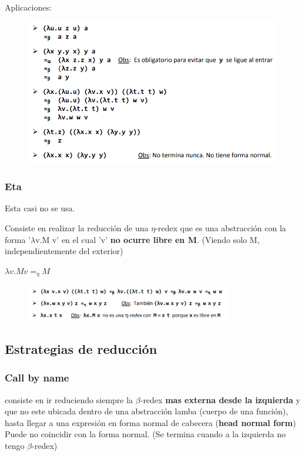 Aplicaciones:
\begin{figure}[!htb]
    \centering
    \includegraphics[width=\textwidth]{img/EjemplosAplicacionBeta.PNG}
\end{figure}

\newpage 
\subsubsection*{Eta}
Esta casi no se usa.

Consiste en realizar la reducción de una $\eta$-redex que es una abstracción con la forma '$\lambda$v.M v' en el cual 'v'\textbf{ no ocurre libre en M}. (Viendo solo M, independientemente del exterior)

\begin{center}
$\lambda v.M v =_{\eta} M$
\end{center}

\begin{figure}[!htb]
    \centering
    \includegraphics[width=0.8\textwidth]{img/EjemplosEta.PNG}
\end{figure}

\subsection*{Estrategias de reducción}

\subsubsection*{Call by name}
consiste en ir reduciendo siempre la $\beta$-redex \textbf{mas externa desde la izquierda} y que no este ubicada dentro de una abstracción lamba (cuerpo de una función), hasta llegar a una expresión en forma normal de cabecera (\textbf{head normal form}) Puede no coincidir con la forma normal. (Se termina cuando a la izquierda no tengo $\beta$-redex)

